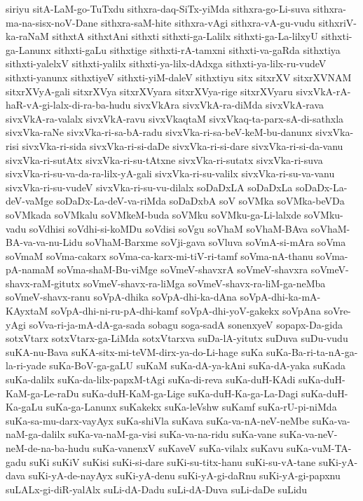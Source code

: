 {siriyu
sitA-LaM-go-TuTxdu
sithxra-daq-SiTx-yiMda
sithxra-go-Li-suva
sithxra-ma-na-sisx-noV-Dane
sithxra-saM-hite
sithxra-vAgi
sithxra-vA-gu-vudu
sithxriV-ka-raNaM
sithxtA
sithxtAni
sithxti
sithxti-ga-Lalilx
sithxti-ga-La-lilxyU
sithxti-ga-Lanunx
sithxti-gaLu
sithxtige
sithxti-rA-tamxni
sithxti-va-gaRda
sithxtiya
sithxti-yalelxV
sithxti-yalilx
sithxti-ya-lilx-dAdxga
sithxti-ya-lilx-ru-vudeV
sithxti-yanunx
sithxtiyeV
sithxti-yiM-daleV
sithxtiyu
sitx
sitxrXV
sitxrXVNAM
sitxrXVyA-gali
sitxrXVya
sitxrXVyara
sitxrXVya-rige
sitxrXVyaru
sivxVkA-rA-haR-vA-gi-lalx-di-ra-ba-hudu
sivxVkAra
sivxVkA-ra-diMda
sivxVkA-rava
sivxVkA-ra-valalx
sivxVkA-ravu
sivxVkaqtaM
sivxVkaq-ta-parx-sA-di-sathxla
sivxVka-raNe
sivxVka-ri-sa-bA-radu
sivxVka-ri-sa-beV-keM-bu-danunx
sivxVka-risi
sivxVka-ri-sida
sivxVka-ri-si-daDe
sivxVka-ri-si-dare
sivxVka-ri-si-da-vanu
sivxVka-ri-sutAtx
sivxVka-ri-su-tAtxne
sivxVka-ri-sutatx
sivxVka-ri-suva
sivxVka-ri-su-va-da-ra-lilx-yA-gali
sivxVka-ri-su-valilx
sivxVka-ri-su-va-vanu
sivxVka-ri-su-vudeV
sivxVka-ri-su-vu-dilalx
soDaDxLA
soDaDxLa
soDaDx-La-deV-vaMge
soDaDx-La-deV-va-riMda
soDaDxbA
soV
soVMka
soVMka-beVDa
soVMkada
soVMkalu
soVMkeM-buda
soVMku
soVMku-ga-Li-lalxde
soVMku-vadu
soVdhisi
soVdhi-si-koMDu
soVdisi
soVgu
soVhaM
soVhaM-BAva
soVhaM-BA-va-va-nu-Lidu
soVhaM-Barxme
soVji-gava
soVluva
soVmA-si-mAra
soVma
soVmaM
soVma-cakarx
soVma-ca-karx-mi-tiV-ri-tamf
soVma-nA-thanu
soVma-pA-namaM
soVma-shaM-Bu-viMge
soVmeV-shavxrA
soVmeV-shavxra
soVmeV-shavx-raM-gitutx
soVmeV-shavx-ra-liMga
soVmeV-shavx-ra-liM-ga-neMba
soVmeV-shavx-ranu
soVpA-dhika
soVpA-dhi-ka-dAna
soVpA-dhi-ka-mA-KAyxtaM
soVpA-dhi-ni-ru-pA-dhi-kamf
soVpA-dhi-yoV-gakekx
soVpAna
soVre-yAgi
soVva-ri-ja-mA-dA-ga-sada
sobagu
soga-sadA
sonenxyeV
sopapx-Da-gida
sotxVtarx
sotxVtarx-ga-LiMda
sotxVtarxva
suDa-lA-yitutx
suDuva
suDu-vudu
suKA-nu-Bava
suKA-sitx-mi-teVM-dirx-ya-do-Li-hage
suKa
suKa-Ba-ri-ta-nA-ga-la-ri-yade
suKa-BoV-ga-gaLU
suKaM
suKa-dA-ya-kAni
suKa-dA-yaka
suKada
suKa-dalilx
suKa-da-lilx-papxM-tAgi
suKa-di-reva
suKa-duH-KAdi
suKa-duH-KaM-ga-Le-raDu
suKa-duH-KaM-ga-Lige
suKa-duH-Ka-ga-La-Dagi
suKa-duH-Ka-gaLu
suKa-ga-Lanunx
suKakekx
suKa-leVshw
suKamf
suKa-rU-pi-niMda
suKa-sa-mu-darx-vayAyx
suKa-shiVla
suKava
suKa-va-nA-neV-neMbe
suKa-va-naM-ga-dalilx
suKa-va-naM-ga-visi
suKa-va-na-ridu
suKa-vane
suKa-va-neV-neM-de-na-ba-hudu
suKa-vanenxV
suKaveV
suKa-vilalx
suKavu
suKa-vuM-TA-gadu
suKi
suKiV
suKisi
suKi-si-dare
suKi-su-titx-hanu
suKi-su-vA-tane
suKi-yA-dava
suKi-yA-de-nayAyx
suKi-yA-denu
suKi-yA-gi-daRnu
suKi-yA-gi-papxnu
suLALx-gi-diR-yalAlx
suLi-dA-Dadu
suLi-dA-Duva
suLi-daDe
suLidu
}
